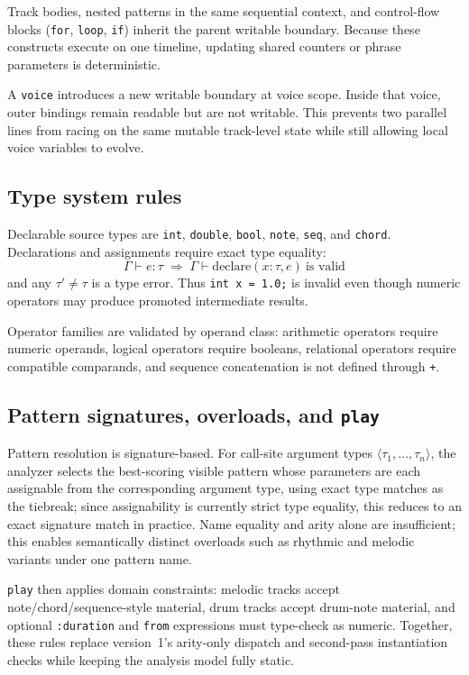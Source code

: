 Track bodies, nested patterns in the same sequential context, and control-flow blocks (\texttt{for}, \texttt{loop},
\texttt{if}) inherit the parent writable boundary.
Because these constructs execute on one timeline, updating shared counters or phrase parameters is deterministic.

A \texttt{voice} introduces a new writable boundary at voice scope.
Inside that voice, outer bindings remain readable but are not writable.
This prevents two parallel lines from racing on the same mutable track-level state while still allowing local voice
variables to evolve.

\subsection{Type system rules}

Declarable source types are \texttt{int}, \texttt{double}, \texttt{bool}, \texttt{note}, \texttt{seq}, and
\texttt{chord}.
Declarations and assignments require exact type equality:
\[
  \Gamma \vdash e : \tau
  \;\Rightarrow\;
  \Gamma \vdash \text{declare}(x:\tau, e)\ \text{is valid}
\]
and any $\tau' \neq \tau$ is a type error.
Thus \texttt{int x = 1.0;} is invalid even though numeric operators may produce promoted intermediate results.

Operator families are validated by operand class:
arithmetic operators require numeric operands, logical operators require booleans, relational operators require
compatible comparands, and sequence concatenation is not defined through \texttt{+}.

\subsection{Pattern signatures, overloads, and \texttt{play}}

Pattern resolution is signature-based.
For call-site argument types $\langle \tau_1,\dots,\tau_n \rangle$, the analyzer selects the best-scoring visible
pattern whose parameters are each assignable from the corresponding argument type, using exact type matches as the
tiebreak; since assignability is currently strict type equality, this reduces to an exact signature match in practice.
Name equality and arity alone are insufficient; this enables semantically distinct overloads such as rhythmic and
melodic variants under one pattern name.

\texttt{play} then applies domain constraints:
melodic tracks accept note/chord/sequence-style material, drum tracks accept drum-note material, and optional
\texttt{:duration} and \texttt{from} expressions must type-check as numeric.
Together, these rules replace version~1's arity-only dispatch and second-pass instantiation checks while keeping the
analysis model fully static.

